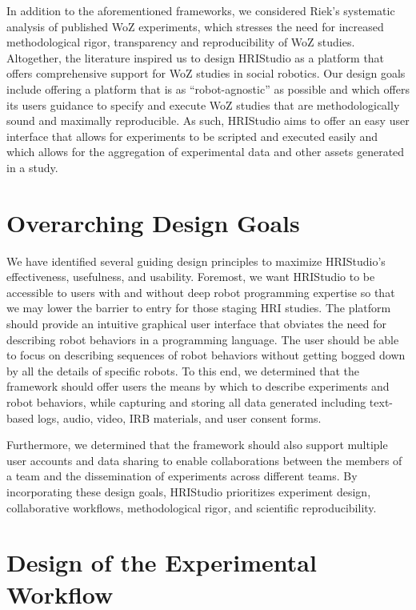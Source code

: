 \documentclass[letterpaper, 10 pt, conference]{ieeeconf}
\begin{document}
In addition to the aforementioned frameworks, we considered Riek's systematic analysis of published WoZ experiments, which stresses the need for increased methodological rigor, transparency and reproducibility of WoZ studies. \cite{Riek2012} Altogether, the literature inspired us to design HRIStudio as a platform that offers comprehensive support for WoZ studies in social robotics. Our design goals include offering a platform that is as ``robot-agnostic'' as possible and which offers its users guidance to specify and execute WoZ studies that are methodologically sound and maximally reproducible. As such, HRIStudio aims to offer an easy user interface that allows for experiments to be scripted and executed easily and which allows for the aggregation of experimental data and other assets generated in a study.

\section{Overarching Design Goals}

We have identified several guiding design principles to maximize HRIStudio's effectiveness, usefulness, and usability. Foremost, we want HRIStudio to be accessible to users with and without deep robot programming expertise so that we may lower the barrier to entry for those staging HRI studies. The platform should provide an intuitive graphical user interface that obviates the need for describing robot behaviors in a programming language. The user should be able to focus on describing sequences of robot behaviors without getting bogged down by all the details of specific robots. To this end, we determined that the framework should offer users the means by which to describe experiments and robot behaviors, while capturing and storing all data generated including text-based logs, audio, video, IRB materials, and user consent forms. 

Furthermore, we determined that the framework should also support multiple user accounts and data sharing to enable collaborations between the members of a team and the dissemination of experiments across different teams. By incorporating these design goals, HRIStudio prioritizes experiment design, collaborative workflows, methodological rigor, and scientific reproducibility.

\section{Design of the Experimental Workflow}
\end{document}
